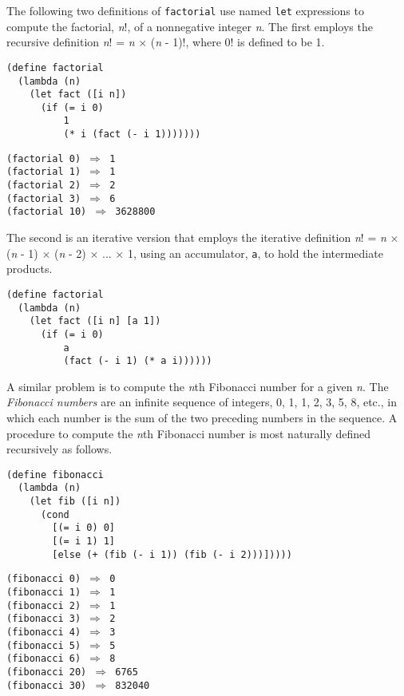 The following two definitions of \label{further_s46}\texttt{factorial} use named \texttt{let}
expressions to compute the factorial, \textit{n}!, of a nonnegative integer \textit{n}.
The first employs the recursive definition \textit{n}! = \textit{n} \(\times\) (\textit{n} - 1)!,
where 0! is defined to be 1.


\begin{alltt}
(define factorial
  (lambda (n)
    (let fact ([i n])
      (if (= i 0)
          1
          (* i (fact (- i 1)))))))
\end{alltt}


\begin{alltt}
(factorial 0) \(\Rightarrow\) 1
(factorial 1) \(\Rightarrow\) 1
(factorial 2) \(\Rightarrow\) 2
(factorial 3) \(\Rightarrow\) 6
(factorial 10) \(\Rightarrow\) 3628800
\end{alltt}


The second is an iterative version that employs the iterative definition
\textit{n}! = \textit{n} \(\times\) (\textit{n} - 1) \(\times\) (\textit{n} - 2) \(\times\) ... \(\times\) 1, using an accumulator,
\texttt{a}, to hold the intermediate products.


\begin{alltt}
(define factorial
  (lambda (n)
    (let fact ([i n] [a 1])
      (if (= i 0)
          a
          (fact (- i 1) (* a i))))))
\end{alltt}


\label{further_fibonacci}A similar problem is to compute the \textit{n}th Fibonacci number for a given
\textit{n}.
\label{further_s47}The \label{further_s48}\textit{Fibonacci numbers} are an infinite sequence of
integers, 0, 1, 1, 2, 3, 5, 8, etc., in which each
number is the sum of the two preceding numbers in the sequence.
A procedure to compute the \textit{n}th Fibonacci number is most naturally
defined recursively as follows.


\begin{alltt}
(define fibonacci
  (lambda (n)
    (let fib ([i n])
      (cond
        [(= i 0) 0]
        [(= i 1) 1]
        [else (+ (fib (- i 1)) (fib (- i 2)))]))))

(fibonacci 0) \(\Rightarrow\) 0
(fibonacci 1) \(\Rightarrow\) 1
(fibonacci 2) \(\Rightarrow\) 1
(fibonacci 3) \(\Rightarrow\) 2
(fibonacci 4) \(\Rightarrow\) 3
(fibonacci 5) \(\Rightarrow\) 5
(fibonacci 6) \(\Rightarrow\) 8
(fibonacci 20) \(\Rightarrow\) 6765
(fibonacci 30) \(\Rightarrow\) 832040
\end{alltt}



